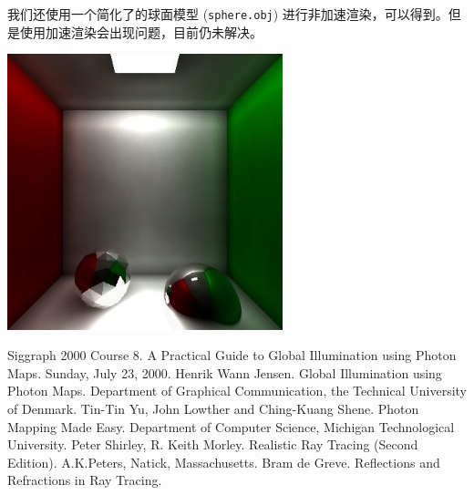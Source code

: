 \documentclass[11pt, a4paper]{article}
\makeatletter
\newcommand\fcaption{\def\@captype{figure}\caption}
\makeatother
\begin{document}
我们还使用一个简化了的球面模型 (\texttt{sphere.obj}) 进行非加速渲染，可以得到\label{sp}。但是使用加速渲染会出现问题，目前仍未解决。

\begin{center}
    \includegraphics[width=8cm]{../outputs/sphere_model_slow.jpeg}
    \fcaption{Sphere (非加速模型)}\label{sp}
\end{center}

\begin{thebibliography}{99}
     Siggraph 2000 Course 8. A Practical Guide to Global Illumination using Photon Maps. Sunday, July 23, 2000.
     Henrik Wann Jensen. Global Illumination using Photon Maps. Department of Graphical Communication, the Technical University of Denmark.
     Tin-Tin Yu, John Lowther and Ching-Kuang Shene. Photon Mapping Made Easy. Department of Computer Science, Michigan Technological University.
     Peter Shirley, R. Keith Morley. Realistic Ray Tracing (Second Edition). A.K.Peters, Natick, Massachusetts.
     Bram de Greve. Reflections and Refractions in Ray Tracing.
\end{thebibliography}
\end{document}

